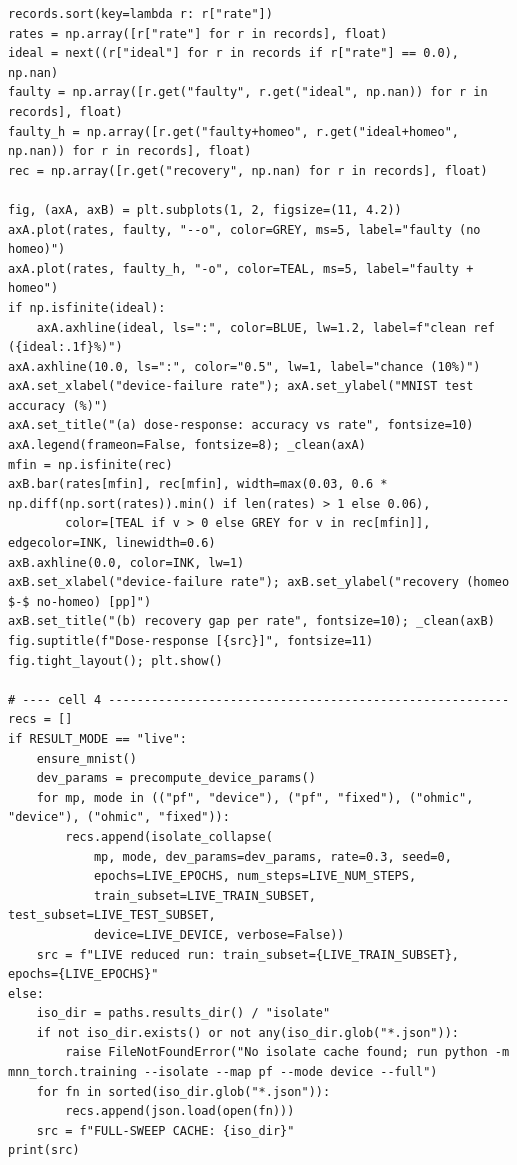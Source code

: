 \begin{lstlisting}[caption={experiments/homeostasis.ipynb},label={lst:mnn-nb-homeostasis}]
records.sort(key=lambda r: r["rate"])
rates = np.array([r["rate"] for r in records], float)
ideal = next((r["ideal"] for r in records if r["rate"] == 0.0), np.nan)
faulty = np.array([r.get("faulty", r.get("ideal", np.nan)) for r in records], float)
faulty_h = np.array([r.get("faulty+homeo", r.get("ideal+homeo", np.nan)) for r in records], float)
rec = np.array([r.get("recovery", np.nan) for r in records], float)

fig, (axA, axB) = plt.subplots(1, 2, figsize=(11, 4.2))
axA.plot(rates, faulty, "--o", color=GREY, ms=5, label="faulty (no homeo)")
axA.plot(rates, faulty_h, "-o", color=TEAL, ms=5, label="faulty + homeo")
if np.isfinite(ideal):
    axA.axhline(ideal, ls=":", color=BLUE, lw=1.2, label=f"clean ref ({ideal:.1f}%)")
axA.axhline(10.0, ls=":", color="0.5", lw=1, label="chance (10%)")
axA.set_xlabel("device-failure rate"); axA.set_ylabel("MNIST test accuracy (%)")
axA.set_title("(a) dose-response: accuracy vs rate", fontsize=10)
axA.legend(frameon=False, fontsize=8); _clean(axA)
mfin = np.isfinite(rec)
axB.bar(rates[mfin], rec[mfin], width=max(0.03, 0.6 * np.diff(np.sort(rates)).min() if len(rates) > 1 else 0.06),
        color=[TEAL if v > 0 else GREY for v in rec[mfin]], edgecolor=INK, linewidth=0.6)
axB.axhline(0.0, color=INK, lw=1)
axB.set_xlabel("device-failure rate"); axB.set_ylabel("recovery (homeo $-$ no-homeo) [pp]")
axB.set_title("(b) recovery gap per rate", fontsize=10); _clean(axB)
fig.suptitle(f"Dose-response [{src}]", fontsize=11)
fig.tight_layout(); plt.show()

# ---- cell 4 --------------------------------------------------------
recs = []
if RESULT_MODE == "live":
    ensure_mnist()
    dev_params = precompute_device_params()
    for mp, mode in (("pf", "device"), ("pf", "fixed"), ("ohmic", "device"), ("ohmic", "fixed")):
        recs.append(isolate_collapse(
            mp, mode, dev_params=dev_params, rate=0.3, seed=0,
            epochs=LIVE_EPOCHS, num_steps=LIVE_NUM_STEPS,
            train_subset=LIVE_TRAIN_SUBSET, test_subset=LIVE_TEST_SUBSET,
            device=LIVE_DEVICE, verbose=False))
    src = f"LIVE reduced run: train_subset={LIVE_TRAIN_SUBSET}, epochs={LIVE_EPOCHS}"
else:
    iso_dir = paths.results_dir() / "isolate"
    if not iso_dir.exists() or not any(iso_dir.glob("*.json")):
        raise FileNotFoundError("No isolate cache found; run python -m mnn_torch.training --isolate --map pf --mode device --full")
    for fn in sorted(iso_dir.glob("*.json")):
        recs.append(json.load(open(fn)))
    src = f"FULL-SWEEP CACHE: {iso_dir}"
print(src)


\end{lstlisting}
